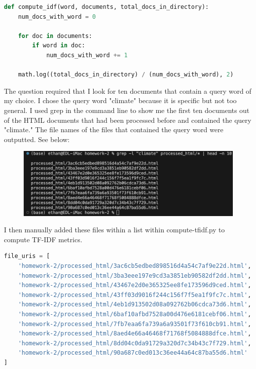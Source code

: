 \documentclass[12pt]{article}
\begin{document}
\begin{lstlisting}[language=Python]
def compute_idf(word, documents, total_docs_in_directory):
    num_docs_with_word = 0
    
    for doc in documents:
        if word in doc:
            num_docs_with_word += 1
    
    math.log((total_docs_in_directory) / (num_docs_with_word), 2)
\end{lstlisting}

The question required that I look for ten documents that contain a query word of my choice. I chose the query word "climate" because it is specific but not too general. I used grep in the command line to show me the first ten documents out of the HTML documents that had been processed before and contained the query "climate." The file names of the files that contained the query word were outputted. See below:

\begin{figure}[ht]
    \centering
    \includegraphics[width=1.0\textwidth]{grep.png} %
\end{figure}

I then manually added these files within a list within compute-tfidf.py to compute TF-IDF metrics.

\begin{lstlisting}[language=Python]
file_uris = [
    'homework-2/processed_html/3ac6cb5edbed898516d4a54c7af9e22d.html',
    'homework-2/processed_html/3ba3eee197e9cd3a3851eb90582df2dd.html',
    'homework-2/processed_html/43467e2d0e365325ee8fe173596d9ced.html',
    'homework-2/processed_html/43ff03d9016f244c156f7f5ea1f9fc7c.html',
    'homework-2/processed_html/4eb1d913502d08a092762b06cdca73d6.html',
    'homework-2/processed_html/6baf10afbd7528a00d476e6181cebf06.html',
    'homework-2/processed_html/7fb7eaa6fa739a6a93501f73f610cb91.html',
    'homework-2/processed_html/8aed4e66a46468f71768f5084888dfce.html',
    'homework-2/processed_html/8dd04c0da91729a320d7c34b43c7f729.html',
    'homework-2/processed_html/90a687c0ed013c36ee44a64c87ba55d6.html'
]
\end{lstlisting}
\end{document}
